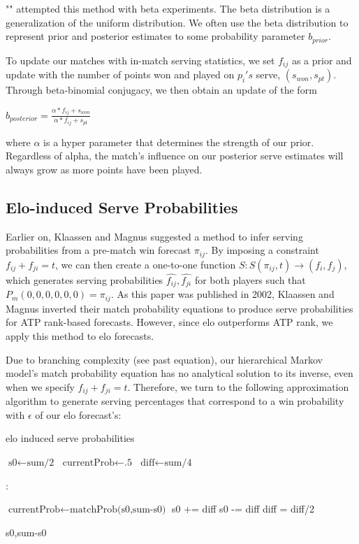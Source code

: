 \documentclass[chapterprefix=false]{report}
\begin{document}
"" attempted this method with beta experiments. The beta distribution is a generalization of the uniform distribution. We often use the beta distribution to represent prior and posterior estimates to some probability parameter $b_{prior}$.

To update our matches with in-match serving statistics, we set $f_{ij}$ as a prior and update with the number of points won and played on $p_i's$ serve, $(s_{won},s_{pt})$. Through beta-binomial conjugacy, we then obtain an update of the form 

$b_{posterior} = \frac{\alpha * f_{ij}+ s_{won}}{\alpha * f_{ij} + s_{pt}}$

where $\alpha$ is a hyper parameter that determines the strength of our prior. Regardless of alpha, the match's influence on our posterior serve estimates will always grow as more points have been played.

\subsection{Elo-induced Serve Probabilities}
Earlier on, Klaassen and Magnus suggested a method to infer serving probabilities from a pre-match win forecast $\pi_{ij}$. By imposing a constraint $f_{ij}+f_{ji}=t$, we can then create a one-to-one function 
$S: S(\pi_{ij},t) \rightarrow (f_i,f_j)$, which generates serving probabilities $\hat{f_{ij}},\hat{f_{ji}}$ for both players such that $P_{m}(0,0,0,0,0,0)=\pi_{ij}$. As this paper was published in 2002, Klaassen and Magnus inverted their match probability equations to produce serve probabilities for ATP rank-based forecasts. However, since elo outperforms ATP rank, we apply this method to elo forecasts.

Due to branching complexity (see past equation), our hierarchical Markov model's match probability equation has no analytical solution to its inverse, even when we specify $f_{ij}+f_{ji}=t$. Therefore, we turn to the following approximation algorithm to generate serving percentages that correspond to a win probability with $\epsilon$ of our elo forecast's:

\begin{algorithm}
\caption{elo induced serve probabilities}\label{euclid}
\begin{algorithmic}[1]
\State $\text{s0} \gets \text{sum/2}$
\State $\text{currentProb} \gets \text{.5}$
\State $\text{diff} \gets \text{sum/4}$

:

\State $\text{currentProb} \gets \text{matchProb(s0,sum-s0)}$
\State s0 += diff 
\Else
\State s0 -= diff
\EndIf
\State diff = diff/2

\EndWhile


\State \Return s0,sum-s0

\EndProcedure
\end{algorithmic}
\end{algorithm}
\end{document}
